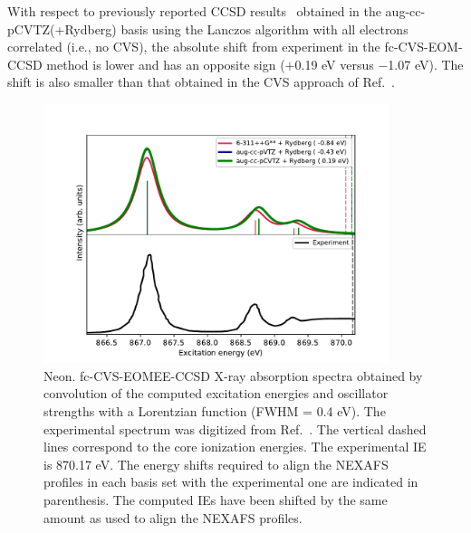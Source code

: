 \documentclass[journal=jctcce,manuscript=article]{achemso}
\begin{document}
With respect to previously reported CCSD results~\cite{coriani2012pra} obtained in the aug-cc-pCVTZ(+Rydberg) basis using the Lanczos algorithm with all electrons correlated (i.e., no CVS), the absolute shift from experiment in the fc-CVS-EOM-CCSD method is lower and has an opposite sign ($+$0.19 eV versus $-$1.07 eV). The shift is also smaller than that obtained 
in the CVS approach of Ref.~. 

\begin{figure}[H]
\includegraphics[width=0.9\textwidth]{Spectra/Ne_aCT.pdf}  
\caption{Neon. fc-CVS-EOMEE-CCSD X-ray absorption spectra obtained by convolution of the computed excitation energies and oscillator strengths with a Lorentzian function (FWHM = 0.4 eV). The experimental spectrum was digitized from Ref.~. 
The vertical dashed lines correspond to the core ionization energies. The experimental IE is 870.17 eV. 
The energy shifts 
required to align the NEXAFS profiles in each basis set with the
experimental one are indicated in parenthesis. The computed IEs have been shifted by the same amount as used to align the NEXAFS profiles.
\label{fgr:neon}
}
\end{figure}
\end{document}
